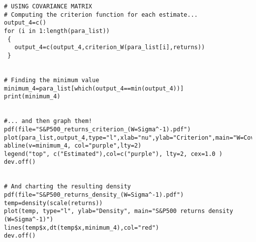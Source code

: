 \begin{appendices}
\begin{verbatim}
# USING COVARIANCE MATRIX
# Computing the criterion function for each estimate...
output_4=c()
for (i in 1:length(para_list))
 {
   output_4=c(output_4,criterion_W(para_list[i],returns))
 }


# Finding the minimum value
minimum_4=para_list[which(output_4==min(output_4))]
print(minimum_4)


#... and then graph them!
pdf(file="S&P500_returns_criterion_(W=Sigma^-1).pdf")
plot(para_list,output_4,type="l",xlab="nu",ylab="Criterion",main="W=Cov(x)")
abline(v=minimum_4, col="purple",lty=2)
legend("top", c("Estimated"),col=c("purple"), lty=2, cex=1.0 )
dev.off()


# And charting the resulting density
pdf(file="S&P500_returns_density_(W=Sigma^-1).pdf")
temp=density(scale(returns))
plot(temp, type="l", ylab="Density", main="S&P500 returns density (W=Sigma^-1)")
lines(temp$x,dt(temp$x,minimum_4),col="red")       
dev.off()
\end{verbatim}
\end{appendices}
